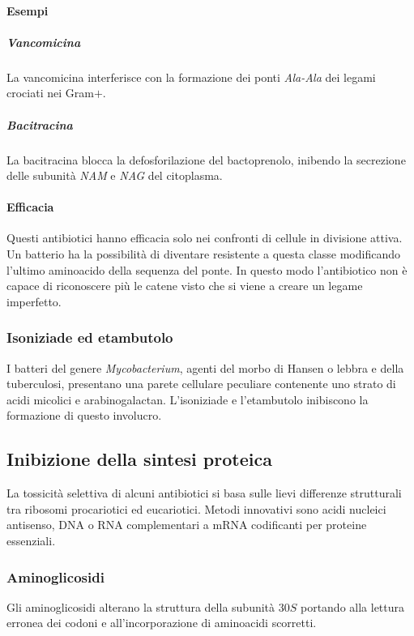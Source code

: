 			\paragraph{Esempi}

				\subparagraph{Vancomicina}
				La vancomicina interferisce con la formazione dei ponti \emph{Ala-Ala} dei legami crociati nei Gram$+$. 

				\subparagraph{Bacitracina}
				La bacitracina blocca la defosforilazione del bactoprenolo, inibendo la secrezione delle subunità \emph{NAM} e \emph{NAG} del citoplasma. 

			\paragraph{Efficacia}
			Questi antibiotici hanno efficacia solo nei confronti di cellule in divisione attiva.
			Un batterio ha la possibilità di diventare resistente a questa classe modificando l'ultimo aminoacido della sequenza del ponte. 
			In questo modo l'antibiotico non è capace di riconoscere più le catene visto che si viene a creare un legame imperfetto.

		\subsubsection{Isoniziade ed etambutolo}
		I batteri del genere \textit{Mycobacterium}, agenti del morbo di Hansen o lebbra e della tuberculosi, presentano una parete cellulare peculiare contenente uno strato di acidi micolici e arabinogalactan. 
		L'isoniziade e l'etambutolo inibiscono la formazione di questo involucro. 

	\subsection{Inibizione della sintesi proteica}
	La tossicità selettiva di alcuni antibiotici si basa sulle lievi differenze strutturali tra ribosomi procariotici ed eucariotici. 
	Metodi innovativi sono acidi nucleici antisenso, DNA o RNA complementari a mRNA codificanti per proteine essenziali.

		\subsubsection{Aminoglicosidi}
		Gli aminoglicosidi alterano la struttura della subunit\`a $30S$ portando alla lettura erronea dei codoni e all'incorporazione di aminoacidi scorretti.
		
